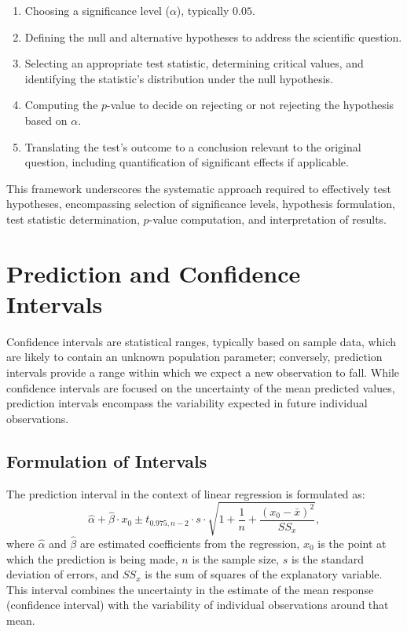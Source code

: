 \documentclass{article}
\begin{document}
\begin{enumerate}
    \item Choosing a significance level ($\alpha$), typically $0.05$.
    \item Defining the null and alternative hypotheses to address the scientific question.
    \item Selecting an appropriate test statistic, determining critical values, and identifying the statistic's distribution under the null hypothesis.
    \item Computing the $p$-value to decide on rejecting or not rejecting the hypothesis based on $\alpha$.
    \item Translating the test's outcome to a conclusion relevant to the original question, including quantification of significant effects if applicable.
\end{enumerate}

This framework underscores the systematic approach required to effectively test hypotheses, encompassing selection of significance levels, hypothesis formulation, test statistic determination, $p$-value computation, and interpretation of results.

\section{Prediction and Confidence Intervals}

Confidence intervals are statistical ranges, typically based on sample data, which are likely to contain an unknown population parameter; conversely, prediction intervals provide a range within which we expect a new observation to fall. While confidence intervals are focused on the uncertainty of the mean predicted values, prediction intervals encompass the variability expected in future individual observations.

\subsection{Formulation of Intervals}
The prediction interval in the context of linear regression is formulated as:
\[
\hat{\alpha} + \hat{\beta} \cdot x_0 \pm t_{0.975, n-2} \cdot s \cdot \sqrt{1 + \frac{1}{n} + \frac{(x_0 - \bar{x})^2}{SS_x}},
\]
where $\hat{\alpha}$ and $\hat{\beta}$ are estimated coefficients from the regression, $x_0$ is the point at which the prediction is being made, $n$ is the sample size, $s$ is the standard deviation of errors, and $SS_x$ is the sum of squares of the explanatory variable. This interval combines the uncertainty in the estimate of the mean response (confidence interval) with the variability of individual observations around that mean.
\end{document}

